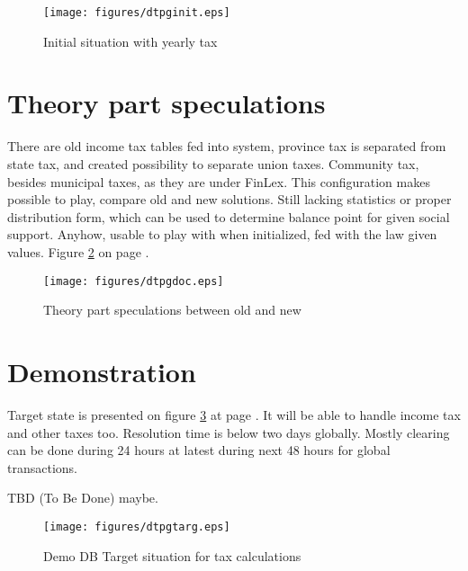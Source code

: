 \begin{figure}
 \begin{center}
  \texttt{[image: figures/dtpginit.eps]}
  \caption{Initial situation with yearly tax}
  \label{fig:DbInitial} 
 \end{center}
\end{figure}

\section{Theory part speculations}
\label{db_theory_speculations}
There are old income tax tables fed into system, province tax is separated from state tax,
and created possibility to separate union taxes. Community tax, besides municipal taxes,
as they are under FinLex. This configuration makes possible to play,
compare old and new solutions.
Still lacking statistics or proper distribution form,
which can be used to determine balance point for given social support.
Anyhow, usable to play with when initialized, fed with the law given values.
Figure \ref{fig:DbSpeculation} on page \pageref{fig:DbSpeculation}. 

\begin{figure}
 \begin{center}
  \texttt{[image: figures/dtpgdoc.eps]}
  \caption{Theory part speculations between old and new}
  \label{fig:DbSpeculation} 
 \end{center}
\end{figure}

\section{Demonstration}
\label{implementation_demo}
Target state is presented on figure \ref{fig:DbDemoTarget} at page \pageref{fig:DbDemoTarget}.
It will be able to handle income tax and other taxes too.
Resolution time is below two days globally.
Mostly clearing can be done during 24 hours at latest during next 48 hours for global transactions.

TBD (To Be Done) maybe.

\begin{figure}
 \begin{center}
  \texttt{[image: figures/dtpgtarg.eps]}
  \caption{Demo DB Target situation for tax calculations}
  \label{fig:DbDemoTarget} 
 \end{center}
\end{figure}

